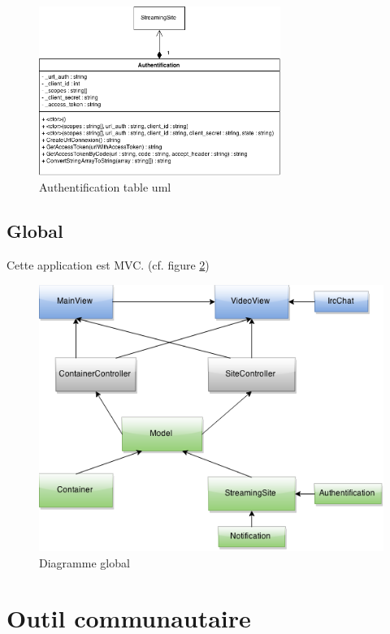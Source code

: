 \documentclass[11pt]{report} %
\begin{document}
			\begin{figure}[h]
				\center
				\includegraphics[width=0.7\textwidth]{../img/authuml.png}
				\caption{Authentification table uml}
				\label{authuml}
			\end{figure}
			
			
	\newpage
	\subsection{Global}
	Cette application est MVC. (cf. figure \ref{Global})
		\begin{figure}[h]
			\center
			\includegraphics[width=1\textwidth]{../img/Model.png}
			\caption{Diagramme global}
			\label{Global}
		\end{figure}
			
	\newpage
	\section{Outil communautaire}
\end{document}
